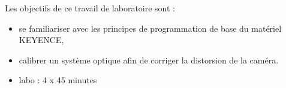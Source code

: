 \noindent Les objectifs de ce travail de laboratoire sont :
\begin{itemize}
\item se familiariser avec les principes de programmation de base du matériel KEYENCE,
\item calibrer un système optique afin de corriger la distorsion de la caméra.
\end{itemize}
\vspace{0.5cm}

\begin{itemize}
\item labo : 4 x 45 minutes\\
\end{itemize}
